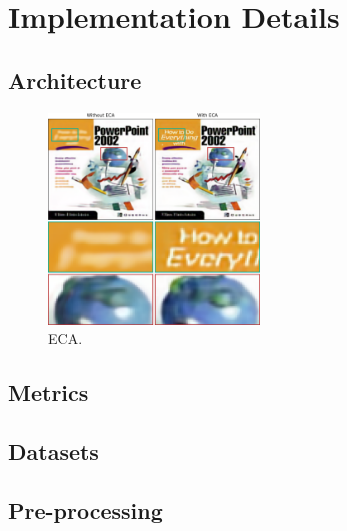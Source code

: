 \chapter{Implementation Details}

\section{Architecture}

\begin{figure}
    \centering
    \includegraphics[width=0.5\textwidth]{img/fig_5.2.png}
    \caption{ECA.}\label{fig:ECA}
\end{figure}

\section{Metrics}

\section{Datasets}

\section{Pre-processing}
